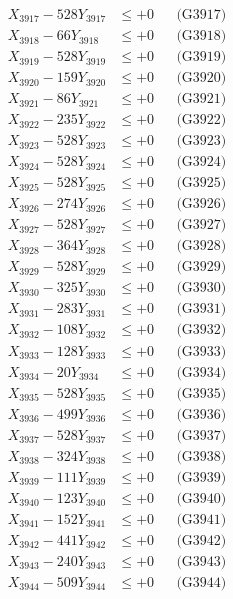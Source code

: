 \documentclass[a4paper,10pt]{article}
\begin{document}
{\begin{align}
X_{3917} - 528Y_{3917} &\leq +0 && \text{(G3917)} \\
X_{3918} - 66Y_{3918} &\leq +0 && \text{(G3918)} \\
X_{3919} - 528Y_{3919} &\leq +0 && \text{(G3919)} \\
X_{3920} - 159Y_{3920} &\leq +0 && \text{(G3920)} \\
\allowbreak
X_{3921} - 86Y_{3921} &\leq +0 && \text{(G3921)} \\
X_{3922} - 235Y_{3922} &\leq +0 && \text{(G3922)} \\
X_{3923} - 528Y_{3923} &\leq +0 && \text{(G3923)} \\
X_{3924} - 528Y_{3924} &\leq +0 && \text{(G3924)} \\
X_{3925} - 528Y_{3925} &\leq +0 && \text{(G3925)} \\
X_{3926} - 274Y_{3926} &\leq +0 && \text{(G3926)} \\
X_{3927} - 528Y_{3927} &\leq +0 && \text{(G3927)} \\
X_{3928} - 364Y_{3928} &\leq +0 && \text{(G3928)} \\
X_{3929} - 528Y_{3929} &\leq +0 && \text{(G3929)} \\
X_{3930} - 325Y_{3930} &\leq +0 && \text{(G3930)} \\
\allowbreak
X_{3931} - 283Y_{3931} &\leq +0 && \text{(G3931)} \\
X_{3932} - 108Y_{3932} &\leq +0 && \text{(G3932)} \\
X_{3933} - 128Y_{3933} &\leq +0 && \text{(G3933)} \\
X_{3934} - 20Y_{3934} &\leq +0 && \text{(G3934)} \\
X_{3935} - 528Y_{3935} &\leq +0 && \text{(G3935)} \\
X_{3936} - 499Y_{3936} &\leq +0 && \text{(G3936)} \\
X_{3937} - 528Y_{3937} &\leq +0 && \text{(G3937)} \\
X_{3938} - 324Y_{3938} &\leq +0 && \text{(G3938)} \\
X_{3939} - 111Y_{3939} &\leq +0 && \text{(G3939)} \\
X_{3940} - 123Y_{3940} &\leq +0 && \text{(G3940)} \\
\allowbreak
X_{3941} - 152Y_{3941} &\leq +0 && \text{(G3941)} \\
X_{3942} - 441Y_{3942} &\leq +0 && \text{(G3942)} \\
X_{3943} - 240Y_{3943} &\leq +0 && \text{(G3943)} \\
X_{3944} - 509Y_{3944} &\leq +0 && \text{(G3944)} \\

\end{align}}
\end{document}
